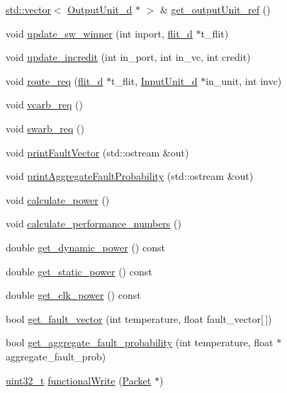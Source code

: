 \begin{DoxyCompactItemize}
\item 
\hyperlink{classstd_1_1vector}{std::vector}$<$ \hyperlink{classOutputUnit__d}{OutputUnit\_\-d} $\ast$ $>$ \& \hyperlink{classRouter__d_a737bc5fa95d99d9a654ea112fdb0d556}{get\_\-outputUnit\_\-ref} ()
\item 
void \hyperlink{classRouter__d_ad498c35c5be2d1b524846119d5e2b254}{update\_\-sw\_\-winner} (int inport, \hyperlink{classflit__d}{flit\_\-d} $\ast$t\_\-flit)
\item 
void \hyperlink{classRouter__d_af313fde0adb2572f30073cff674722d8}{update\_\-incredit} (int in\_\-port, int in\_\-vc, int credit)
\item 
void \hyperlink{classRouter__d_ace403705bf919b1d73f46d5862041eb9}{route\_\-req} (\hyperlink{classflit__d}{flit\_\-d} $\ast$t\_\-flit, \hyperlink{classInputUnit__d}{InputUnit\_\-d} $\ast$in\_\-unit, int invc)
\item 
void \hyperlink{classRouter__d_a52b408294e91b209388f94238bc709fd}{vcarb\_\-req} ()
\item 
void \hyperlink{classRouter__d_a62f4a4369808a4f33896a2cc80b277d5}{swarb\_\-req} ()
\item 
void \hyperlink{classRouter__d_a662a706b4bf7b0d3775e5f8faea92887}{printFaultVector} (std::ostream \&out)
\item 
void \hyperlink{classRouter__d_a564a71ca2f866497999975cb0dbe0caf}{printAggregateFaultProbability} (std::ostream \&out)
\item 
void \hyperlink{classRouter__d_afb66ad9c790a20020a752e958f64961a}{calculate\_\-power} ()
\item 
void \hyperlink{classRouter__d_ab129d2922a83d8fe29b465df6fc298b8}{calculate\_\-performance\_\-numbers} ()
\item 
double \hyperlink{classRouter__d_a10bdb0a8b5af73052370b12b1045bd10}{get\_\-dynamic\_\-power} () const 
\item 
double \hyperlink{classRouter__d_aeb5933543cfdeb1668baed5ce7c68351}{get\_\-static\_\-power} () const 
\item 
double \hyperlink{classRouter__d_aaed4e89d3af8d4de26d6a9af17cff0f1}{get\_\-clk\_\-power} () const 
\item 
bool \hyperlink{classRouter__d_a28444a3dd905780dae59ba987649d06e}{get\_\-fault\_\-vector} (int temperature, float fault\_\-vector\mbox{[}$\,$\mbox{]})
\item 
bool \hyperlink{classRouter__d_ae994f84621b36472148c41e017b4e78b}{get\_\-aggregate\_\-fault\_\-probability} (int temperature, float $\ast$aggregate\_\-fault\_\-prob)
\item 
\hyperlink{Type_8hh_a435d1572bf3f880d55459d9805097f62}{uint32\_\-t} \hyperlink{classRouter__d_aba9037f662122b5f2e85647d35670e5c}{functionalWrite} (\hyperlink{classPacket}{Packet} $\ast$)
\end{DoxyCompactItemize}
